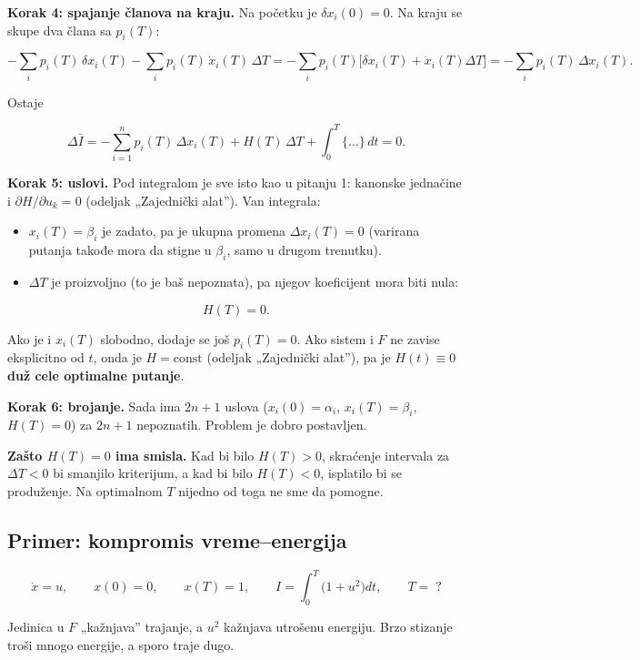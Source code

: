 \documentclass[11pt,a4paper,parskip=half,headsepline,numbers=noenddot]{scrartcl}
\begin{document}
\textbf{Korak 4: spajanje članova na kraju.} Na početku je \(\delta x_i(0) = 0\). Na kraju se skupe dva člana sa \(p_i(T)\):

\[-\sum_i p_i(T)\,\delta x_i(T) - \sum_i p_i(T)\,\dot x_i(T)\,\Delta T = -\sum_i p_i(T)\big[\delta x_i(T) + \dot x_i(T)\Delta T\big] = -\sum_i p_i(T)\,\Delta x_i(T) .\]

Ostaje

\[\Delta\bar I = -\sum_{i=1}^n p_i(T)\,\Delta x_i(T) + H(T)\,\Delta T + \int_0^T\{\dots\}\,dt = 0 .\]

\textbf{Korak 5: uslovi.} Pod integralom je sve isto kao u pitanju 1: kanonske jednačine i \(\partial H/\partial u_k = 0\) (odeljak „Zajednički alat''). Van integrala:

\begin{itemize}
\item \(x_i(T) = \beta_i\) je zadato, pa je ukupna promena \(\Delta x_i(T) = 0\) (varirana putanja takođe mora da stigne u \(\beta_i\), samo u drugom trenutku).
\item \(\Delta T\) je proizvoljno (to je baš nepoznata), pa njegov koeficijent mora biti nula:
\end{itemize}

\begin{kljucna}
\[H(T) = 0 .\]

Ako je i \(x_i(T)\) slobodno, dodaje se još \(p_i(T) = 0\). Ako sistem i \(F\) ne zavise eksplicitno od \(t\), onda je \(H = \text{const}\) (odeljak „Zajednički alat''), pa je \textbf{\(H(t) \equiv 0\) duž cele optimalne putanje}.
\end{kljucna}

\textbf{Korak 6: brojanje.} Sada ima \(2n + 1\) uslova (\(x_i(0) = \alpha_i\), \(x_i(T) = \beta_i\), \(H(T) = 0\)) za \(2n + 1\) nepoznatih. Problem je dobro postavljen.

\textbf{Zašto \(H(T) = 0\) ima smisla.} Kad bi bilo \(H(T) > 0\), skraćenje intervala za \(\Delta T < 0\) bi smanjilo kriterijum, a kad bi bilo \(H(T) < 0\), isplatilo bi se produženje. Na optimalnom \(T\) nijedno od toga ne sme da pomogne.

\subsection{Primer: kompromis vreme--energija}

\[\dot x = u, \qquad x(0) = 0, \qquad x(T) = 1, \qquad I = \int_0^T \big(1 + u^2\big)dt, \qquad T = \;?\]

Jedinica u \(F\) „kažnjava'' trajanje, a \(u^2\) kažnjava utrošenu energiju. Brzo stizanje troši mnogo energije, a sporo traje dugo.
\end{document}
